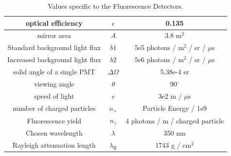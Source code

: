 \begin{table}
\centering
\begin{tabular}{|c|c|c|}
\hline
optical efficiency & $\epsilon$ & 0.135 \\ \hline
mirror area & $A$ & 3.8 m$^2$ \\ \hline
Standard background light flux & $b1$ & 5e5 photons / m$^2$ / sr / $\mu$s \\ \hline
Increased background light flux & $b2$ & 5e6 photons / m$^2$ / sr / $\mu$s \\ \hline
solid angle of a single PMT & $\Delta\Omega$ & 5.38e-4 sr \\ \hline
viewing angle & $\theta$ & 90$^\circ$ \\ \hline
speed of light & $c$ & 3e2 m / $\mu$s \\ \hline
number of charged particles & $n_+$ & Particle Energy / 1e9 \\ \hline
Fluorescence yield & $n_{\gamma}$ & 4 photons / m / charged particle\\ \hline
Chosen wavelength & $\lambda$ & 350 nm \\ \hline
Rayleigh attenuation length & $\lambda_{\mathrm{R}}$ & 1743 g / cm$^2$ \\ \hline
\end{tabular}
\caption{Values specific to the Fluorescence Detectors.} \label{tab:FDvalues}
\end{table}

